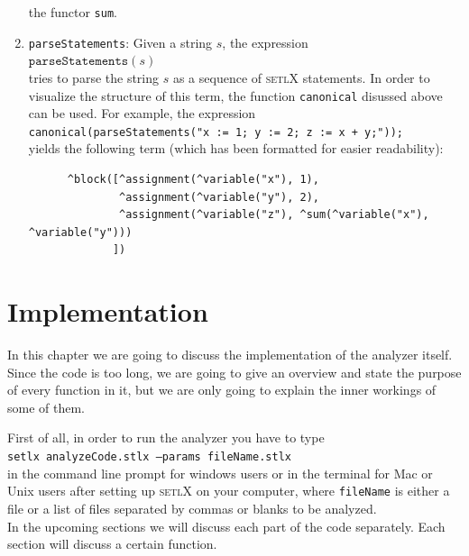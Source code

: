 \documentclass[11pt]{report}
\begin{document}
\begin{enumerate}
      the functor \texttt{sum}.
\item \texttt{parseStatements}:  Given a string $s$, the expression
      \\[0.2cm]
      \hspace*{1.3cm}
      $\mathtt{parseStatements}(s)$ 
      \\[0.2cm]
      tries to parse the string $s$ as a sequence of \textsc{setlX} statements.   In order to visualize the structure of
      this term,  the function \texttt{canonical} disussed above can be used.  For
      example, the expression
      \\[0.2cm]
      \hspace*{1.3cm}
      \texttt{canonical(parseStatements("x := 1; y := 2; z := x + y;"));}
      \\[0.2cm]
      yields the following term (which has been formatted for easier readability):
\begin{verbatim}
      ^block([^assignment(^variable("x"), 1), 
              ^assignment(^variable("y"), 2), 
              ^assignment(^variable("z"), ^sum(^variable("x"), ^variable("y")))
             ])
\end{verbatim}
\end{enumerate}

\chapter{Implementation}

In this chapter we are going to discuss the implementation of the analyzer itself. Since the code is too long, we are going to give an overview and state the purpose of every function in it, but we are only going to explain the inner workings of some of them. 

First of all, in order to run the analyzer you have to type
\\[0.2cm]
\hspace*{1.3cm}
\texttt{setlx analyzeCode.stlx --params fileName.stlx}
\\[0.2cm]
in the command line prompt for windows users or in the terminal for Mac or Unix users after setting up \textsc{setlX} on your computer, where \texttt{fileName} is either a file or a list of files separated by commas or blanks to be analyzed.
\\

In the upcoming sections we will discuss each part of the code separately. Each section will discuss a certain function.
\end{document}
